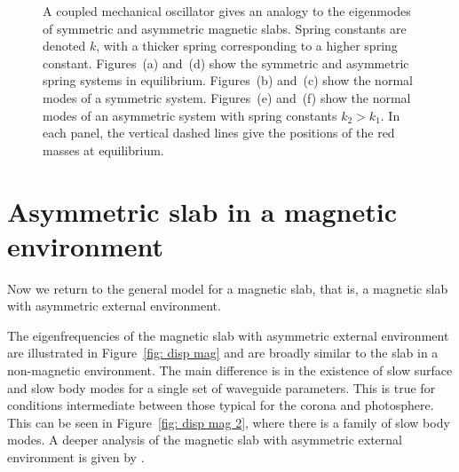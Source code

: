 \begin{figure}
{{{
			\label{fig: springs asym anti-phase}}}}

	\caption{A coupled mechanical oscillator gives an analogy to the eigenmodes of symmetric and asymmetric magnetic slabs. Spring constants are denoted $k$, with a thicker spring corresponding to a higher spring constant. Figures~(a) and~(d) show the symmetric and asymmetric spring systems in equilibrium. Figures~(b) and~(c) show the normal modes of a symmetric system. Figures~(e) and~(f) show the normal modes of an asymmetric system with spring constants $k_2 > k_1$. In each panel, the vertical dashed lines give the positions of the red masses at equilibrium.}
	\label{fig: springs all}
\end{figure}


\section{Asymmetric slab in a magnetic environment}
\label{sec: EVP mag}

Now we return to the general model for a magnetic slab, that is, a magnetic slab with asymmetric external environment.

The eigenfrequencies of the magnetic slab with asymmetric external environment are illustrated in Figure~\ref{fig: disp mag} and are broadly similar to the slab in a non-magnetic environment. The main difference is in the existence of slow surface and slow body modes for a single set of waveguide parameters. This is true for conditions intermediate between those typical for the corona and photosphere. This can be seen in Figure~\ref{fig: disp mag 2}, where there is a family of slow body modes. A deeper analysis of the magnetic slab with asymmetric external environment is given by \cite{zsa_etal18}.

